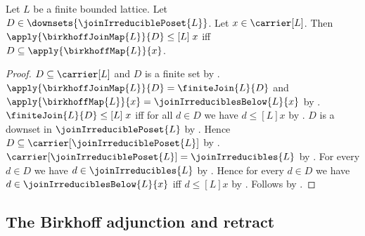 \begin{theorem}\label{birkhoff_join_leq_iff_subseteq_map}
    Let $L$ be a finite bounded lattice.
    Let $D\in\downsets{\joinIrreduciblePoset{L}}$.
    Let $x\in\carrier[L]$.
    Then $\apply{\birkhoffJoinMap{L}}{D}\mathrel{\leq[L]}x$ iff
        $D\subseteq\apply{\birkhoffMap{L}}{x}$.
\end{theorem}
\begin{proof}
    $D\subseteq\carrier[L]$ and $D$ is a finite set by
        .
    $\apply{\birkhoffJoinMap{L}}{D}=\finiteJoin{L}{D}$ and
        $\apply{\birkhoffMap{L}}{x}=\joinIrreduciblesBelow{L}{x}$ by
        .
    $\finiteJoin{L}{D}\mathrel{\leq[L]}x$ iff
        for all $d\in D$ we have $d\mathrel{\leq[L]}x$ by
        .
    $D$ is a downset in $\joinIrreduciblePoset{L}$ by
        .
    Hence $D\subseteq\carrier[\joinIrreduciblePoset{L}]$ by
        .
    $\carrier[\joinIrreduciblePoset{L}]=\joinIrreducibles{L}$ by
        .
    For every $d\in D$ we have $d\in\joinIrreducibles{L}$ by
        .
    Hence for every $d\in D$ we have
        $d\in\joinIrreduciblesBelow{L}{x}$ iff
            $d\mathrel{\leq[L]}x$ by
        .
    Follows by .
\end{proof}

\subsection{The Birkhoff adjunction and retract}

